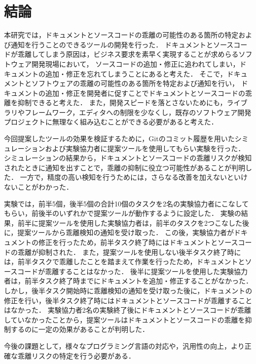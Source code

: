 \chapter{結論}
本研究では，ドキュメントとソースコードの乖離の可能性のある箇所の特定および通知を行うことのできるツールの開発を行った．
ドキュメントとソースコードが乖離してしまう原因は，ビジネス要求を素早く実現することが求めらるソフトウェア開発現場において，
ソースコードの追加・修正に追われてしまい，ドキュメントの追加・修正を忘れてしまうことにあると考えた．
そこで，ドキュメントとソフトウェアの乖離の可能性のある箇所を特定および通知を行い，
ドキュメントの追加・修正を開発者に促すことでドキュメントとソースコードの乖離を抑制できると考えた．
また，開発スピードを落とさないためにも，ライブラリやフレームワーク，エディタへの制限を少なくし，既存のソフトウェア開発プロジェクトに無理なく組み込むことができる必要があると考えた．

今回提案したツールの効果を検証するために，Gitのコミット履歴を用いたシミュレーションおよび実験協力者に提案ツールを使用してもらい実験を行った．
シミュレーションの結果から，ドキュメントとソースコードの乖離リスクが検知されたときに通知を出すことで，乖離の抑制に役立つ可能性があることが判明した．
一方で，精度の高い検知を行うためには，さらなる改善を加えないといけないことがわかった．

実験では，前半5個，後半5個の合計10個のタスクを2名の実験協力者にこなしてもらい，前後半のいずれかで提案ツールが動作するように設定した．
実験の結果，前半に提案ツールを使用した実験協力者は，前半のタスクを2つこなした後に，提案ツールから乖離検知の通知を受け取った．
この後，実験協力者がドキュメントの修正を行ったため，前半タスク終了時にはドキュメントとソースコードの乖離が抑制された．
また，提案ツールを使用しない後半タスク終了時には，前半タスクで乖離したことを踏まえて作業を行ったため，ドキュメントとソースコードが乖離することはなかった．
後半に提案ツールを使用した実験協力者は，前半タスク終了時までにドキュメントを追加・修正することがなかった．
しかし，後半タスク開始時に乖離検知の通知を受け取った後に，ドキュメントの修正を行い，後半タスク終了時にはドキュメントとソースコードが乖離することはなかった．
実験協力者2名の実験終了後にドキュメントとソースコードが乖離していなかったことから，提案ツールはドキュメントとソースコードの乖離を抑制するのに一定の効果があることが判明した．

今後の課題として，様々なプログラミング言語の対応や，汎用性の向上，より正確な乖離リスクの特定を行う必要がある．